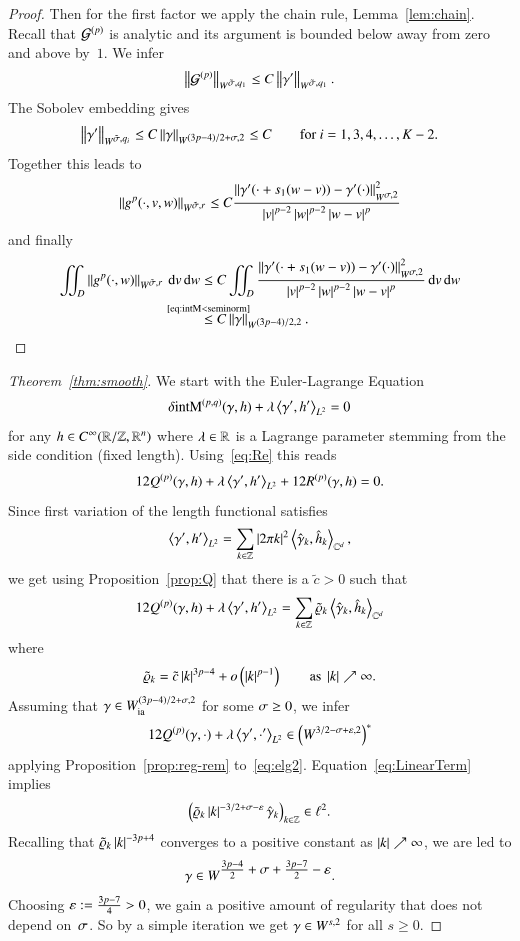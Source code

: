 \begin{proof}
  Then for the first factor we apply the chain rule, Lemma~\ref{lem:chain}.
  Recall that $\G$ is analytic and its argument is bounded below away from zero
  and above by~$1$.
  We infer
  \begin{equation*}
   \norm{\G}_{\W[\tilde\s,q_{1}]}
   \leq C \norm\dg_{\W[ \tilde \sigma ,q_{1}]}.
  \end{equation*}
  The Sobolev embedding gives
  \[ \norm{\dg}_{\W[ \tilde \sigma ,q_{i}]} \le C \norm\g_{\W[(3p-4)/2+\s,2]} \le  C \qquad \text{for } i=1,3,4,\dots,K-2. \]
  Together this leads to
  \[ \norm{\gp(\cdot,v,w)}_{\W[\tilde\s,r]} \le C\frac{\norm{\dg(\cdot+s_{1}(w-v))-\dg(\cdot)}_{\W[\s,2]}^{2}}{\abs v^{p-2}\abs w^{p-2} \abs{w-v}^p} \]
  and finally
  \begin{align*}
     \iint_{D} \norm{\gp(\cdot,w)}_{\W[\tilde\s,r]} \d v \d w
     &\le C \iint_{D} \frac{\norm{\dg(\cdot+s_{1}(w-v))-\dg(\cdot)}_{\W[\s,2]}^{2}}{\abs v^{p-2}\abs w^{p-2} \abs{w-v}^p} \d v \d w \\
     &\refeq[\le]{intM<seminorm} C\norm\g_{{\W[(3p-4)/2,2]}}.
  \end{align*} 
 \end{proof}
 
 \begin{proof}[Theorem~\ref{thm:smooth}]
  We start with the Euler-Lagrange Equation
  \begin{equation}\label{eq:elg}
   \delta\E(\g,h)+\lambda\sp{\dg,\dh}_{L^2} = 0
  \end{equation}
  for any $h\in C^\infty\rzd$
  where $\lambda\in\R$ is a Lagrange parameter stemming from the side condition (fixed length).
  Using~\eqref{eq:Re} this reads
  \begin{equation}\label{eq:elg2}
   12\Q(\g,h) + \lambda\sp{\dg,\dh}_{L^2} + 12\Re[](\g,h) = 0.
  \end{equation}
  Since first variation of the length functional satisfies
  \begin{equation*}
   \sp{\dg,\dh}_{L^2} = \sum_{k\in \mathbb Z} |2\pi k|^2 \sp{\hat\g_{k},\hat h_{k}}_{\C^{d}},
  \end{equation*}
  we get using  Proposition~\ref{prop:Q} that there is a $\tilde c>0$ such that
  \begin{equation}\label{eq:LinearTerm}
  12\Q(\g,h) + \lambda\sp{\dg,\dh}_{L^2} = \sum_{k\in\Z} \tilde\rho_k\sp{\hat \g_k,\hat h_k}_{\C^d}
  \end{equation}
  where
  \[ \tilde\rho_k = \tilde c\abs k^{3p-4} + o\br{\abs k^{p-1}}
     \qquad\text{as }\abs k\nearrow\infty. \]
  Assuming that $\g\in\Wia[(3p-4)/2+\s,2]$ for some $\s\ge0$,
  we infer
  \[ 12\Q(\g,\cdot) + \lambda\sp{\dg,\cdot'}_{L^2} \in \br{\W[3/2-\s+\eps,2]}^{*} \]
   applying Proposition~\ref{prop:reg-rem} to~\eqref{eq:elg2}.
  Equation~\eqref{eq:LinearTerm} implies
  \[ \br{\tilde\rho_{k}\abs k^{-3/2+\sigma-\eps}\hat\g_{k}}_{k\in\Z} \in \ell^{2}. \]
  Recalling that $\tilde\rho_{k}\abs k^{{-3p+4}}$ converges to a positive constant as $\abs k\nearrow\infty$, we are led to
  \[ \g\in\W[\textstyle\frac{3p-4}2+\s+\frac{3p-7}2-\eps]. \]
  Choosing $\eps:=\frac{3p-7}4>0$, we gain a positive amount of regularity
  that does not depend on~$\s$. So by a simple iteration we get $\g \in W^{s,2}$
   for all $s \geq 0$.
  \end{proof}